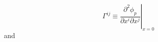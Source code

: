 \begin{equation}
\Gamma^{ij} \equiv \left. \frac{\partial^2 \phi_p}{\partial x^i \partial x^j} \right|_{x=0}
\end{equation}
and
  